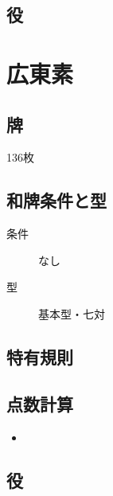 \documentclass{ltjsarticle}
\begin{document}
\subsection{役}
\begin{description}
    \item[]
\end{description}
\section{広東素}
\subsection{牌}136枚
\subsection{和牌条件と型}
\begin{description}
    \item[条件] なし
    \item[型] 基本型・七対
\end{description}
\subsection{特有規則}
\begin{description}
    \item[]
\end{description}
\subsection{点数計算}
\begin{itemize}
    \item
\end{itemize}
\subsection{役}
\begin{description}
    \item[]
\end{description}
\end{document}
